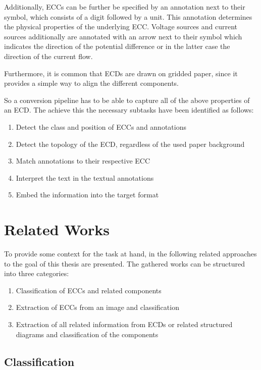 Additionally, \acp{ECC} can be further be specified by an annotation next to their symbol, which consists of a digit followed by a unit.
This annotation determines the physical properties of the underlying \ac{ECC}.
Voltage sources and current sources additionally are annotated with an arrow next to their symbol which indicates the direction of the potential difference or in the latter case the direction of the current flow.

Furthermore, it is common that \acp{ECD} are drawn on gridded paper, since it provides a simple way to align the different components.

So a conversion pipeline has to be able to capture all of the above properties of an \ac{ECD}.
The achieve this the necessary subtasks have been identified as follows:
\begin{enumerate}
    \item Detect the class and position of \acp{ECC} and annotations
    \item Detect the topology of the \ac{ECD}, regardless of the used paper background
    \item Match annotations to their respective \ac{ECC}
    \item Interpret the text in the textual annotations
    \item Embed the information into the target format
\end{enumerate}

\section{Related Works}

To provide some context for the task at hand, in the following related approaches to the goal of this thesis are presented.
The gathered works can be structured into three categories:
\begin{enumerate}
    \item Classification of \acp{ECC} and related components
    \item Extraction of \acp{ECC} from an image and classification
    \item Extraction of all related information from \acp{ECD} or related structured diagrams and classification of the components
\end{enumerate}

\subsection{Classification}

